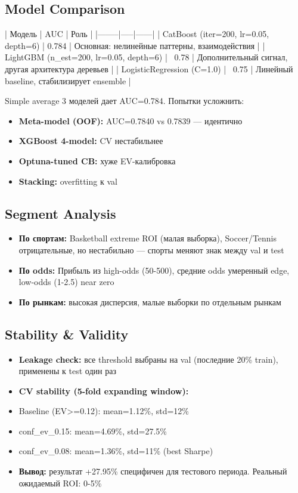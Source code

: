 \documentclass[12pt,a4paper]{article}
\begin{document}
\subsection{Model Comparison}
| Модель | AUC | Роль |
|--------|-----|------|
| CatBoost (iter=200, lr=0.05, depth=6) | 0.784 | Основная: нелинейные паттерны, взаимодействия |
| LightGBM (n\_est=200, lr=0.05, depth=6) | ~0.78 | Дополнительный сигнал, другая архитектура деревьев |
| LogisticRegression (C=1.0) | ~0.75 | Линейный baseline, стабилизирует ensemble |

Simple average 3 моделей дает AUC=0.784. Попытки усложнить:
\begin{itemize}
  \item \textbf{Meta-model (OOF):} AUC=0.7840 vs 0.7839 — идентично
  \item \textbf{XGBoost 4-model:} CV нестабильнее
  \item \textbf{Optuna-tuned CB:} хуже EV-калибровка
  \item \textbf{Stacking:} overfitting к val
\end{itemize}

\subsection{Segment Analysis}
\begin{itemize}
  \item \textbf{По спортам:} Basketball extreme ROI (малая выборка), Soccer/Tennis отрицательные, но нестабильно — спорты меняют знак между val и test
  \item \textbf{По odds:} Прибыль из high-odds (50-500), средние odds умеренный edge, low-odds (1-2.5) near zero
  \item \textbf{По рынкам:} высокая дисперсия, малые выборки по отдельным рынкам
\end{itemize}

\subsection{Stability \& Validity}
\begin{itemize}
  \item \textbf{Leakage check:} все threshold выбраны на val (последние 20\% train), применены к test один раз
  \item \textbf{CV stability (5-fold expanding window):}
  \item Baseline (EV>=0.12): mean=1.12\%, std=12\%
  \item conf\_ev\_0.15: mean=4.69\%, std=27.5\%
  \item conf\_ev\_0.08: mean=1.36\%, std=11\% (best Sharpe)
  \item \textbf{Вывод:} результат +27.95\% специфичен для тестового периода. Реальный ожидаемый ROI: 0-5\%
\end{itemize}
\end{document}
